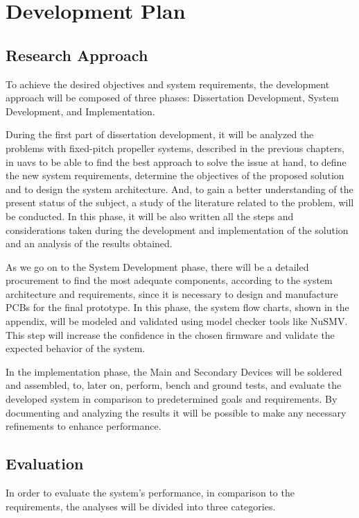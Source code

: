 \chapter{Development Plan}
\label{chap:Chapter5}
\section{Research Approach}
To achieve the desired objectives and system requirements, the development approach will be composed of three phases: Dissertation Development, System Development, and Implementation.

During the first part of dissertation development, it will be analyzed the problems with fixed-pitch propeller systems, described in the previous chapters, in \glspl{uav} to be able to find the best approach to solve the issue at hand, to define the new system requirements, determine the objectives of the proposed solution and to design the system architecture.
And, to gain a better understanding of the present status of the subject, a study of the literature related to the problem, will be conducted.
In this phase, it will be also written all the steps and considerations taken during the development and implementation of the solution and an analysis of the results obtained.

As we go on to the System Development phase, there will be a detailed procurement to find the most adequate components, according to the system architecture and requirements, since it is necessary to design and manufacture \glspl{PCB} for the final prototype.
In this phase, the system flow charts, shown in the appendix, will be modeled and validated using model checker tools like NuSMV.
This step will increase the confidence in the chosen firmware and validate the expected behavior of the system.

In the implementation phase, the Main and Secondary Devices will be soldered and assembled, to, later on, perform, bench and ground tests, and evaluate the developed system in comparison to predetermined goals and requirements.
By documenting and analyzing the results it will be possible to make any necessary refinements to enhance performance.


\section{Evaluation}
In order to evaluate the system's performance, in comparison to the requirements, the analyses will be divided into three categories.

